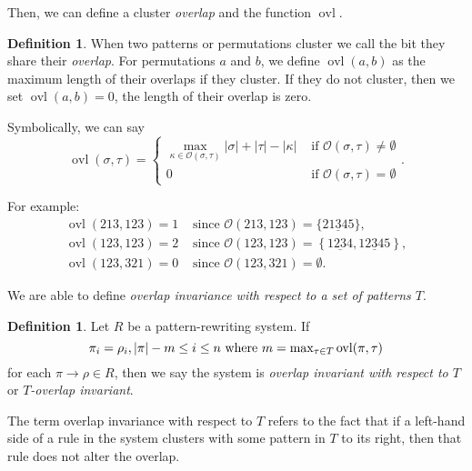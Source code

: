 \documentclass[a4paper, 11pt, english]{article}
\newcommand{\patternrule}{ \to \!}
\theoremstyle{definition}
\newtheorem{definition}[theorem]{Definition}
\newcommand{\Ocal}{\mathcal{O}}
\DeclareMathOperator{\ovl}{ovl}
\begin{document}
Then, we can define a cluster \emph{overlap} and the function $\ovl$.
\begin{definition}
  When two patterns or permutations cluster we call the bit they share their \emph{overlap}.
  For permutations $a$ and $b$, we define $\ovl(a,b)$ as the maximum length of their overlaps if they 
  cluster. If they do not cluster, then we set $\ovl(a,b)=0$, the length of their overlap is zero.

  Symbolically, we can say
  \[
    \ovl(\sigma, \tau) = 
      \begin{cases}
        \max\limits_{\kappa \in \Ocal(\sigma, \tau)} |\sigma| + |\tau| - |\kappa| & \mbox{ if } \Ocal(\sigma, \tau) \neq \emptyset \\
        0 & \text{ if $\Ocal(\sigma, \tau) = \emptyset$}
      \end{cases}.
  \]

  For example:
  \begin{align*}
    \ovl(213, 123) = 1 & \text{ since } \Ocal(213, 123) = \{ 21\underline{3}45 \}, \\
    \ovl(123, 123) = 2 & \text{ since } \Ocal(123, 123) = \left\{ 1\underline{23}4, 12\underline{3}45
  \right\}, \\
  \ovl(123, 321) = 0 & \text{ since } \Ocal(123, 321) = \emptyset.
  \end{align*}
\end{definition}

We are able to define \emph{overlap invariance with respect to a set of patterns $T$}.
\begin{definition}
    Let $R$ be a pattern-rewriting system. If
    \[
        \pi_i = \rho_i, |\pi|-m \leq i \leq n \  \textnormal{where}
        \ m = \max\nolimits_{\tau \in T} \ovl(\pi, \tau)
    \]
    for each $\pi \patternrule \rho \in R$,
    then we say the system is \emph{overlap invariant with respect to $T$} or \emph{$T$-overlap
    invariant}.
\end{definition}

The term overlap invariance with respect to $T$ refers to the fact that if a left-hand side of a rule in the system clusters
with some pattern in $T$ to its right, then that rule does not alter the overlap.
\end{document}

